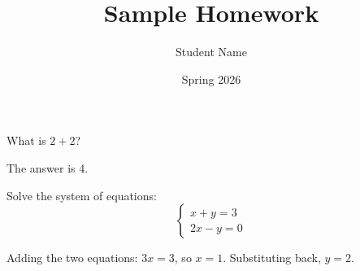 \documentclass{homework}
\title{Sample Homework}
\author{Student Name}
\date{Spring 2026}
\begin{document}
\maketitle

\begin{problem}
What is $2+2$?
\end{problem}

\begin{solution}
The answer is 4.
\end{solution}

\begin{problem}
Solve the system of equations:
\[
\begin{cases}
x + y = 3 \\
2x - y = 0
\end{cases}
\]
\end{problem}

\begin{solution}
Adding the two equations: $3x = 3$, so $x = 1$. Substituting back, $y = 2$.
\end{solution}
\end{document}
